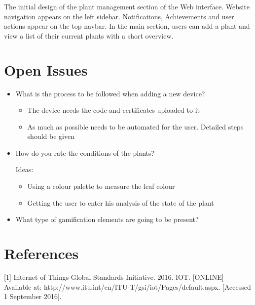 \documentclass{article}
\begin{document}
The initial design of the plant management section of the Web interface. Website navigation appears on the left sidebar. Notifications, Achievements and user actions appear on the top navbar. In the main section, users can add a plant and view a list of their current plants with a short overview.

\section{Open Issues}
\begin{itemize}
	\item What is the process to be followed when adding a new device?
	
	\begin{itemize}
		\item The device needs the code and certificates uploaded to it
		\item As much as possible needs to be automated for the user. Detailed steps should be given
	\end{itemize}

	\item How do you rate the conditions of the plants?
	
	Ideas:
	\begin{itemize}
		\item Using a colour palette to measure the leaf colour
		\item Getting the user to enter his analysis of the state of the plant
	\end{itemize}
	
	\item What type of gamification elements are going to be present?
\end{itemize}

\section{References}
[1] Internet of Things Global Standards Initiative. 2016. IOT. [ONLINE] Available at: http://www.itu.int/en/ITU-T/gsi/iot/Pages/default.aspx. [Accessed 1 September 2016].
\end{document}
